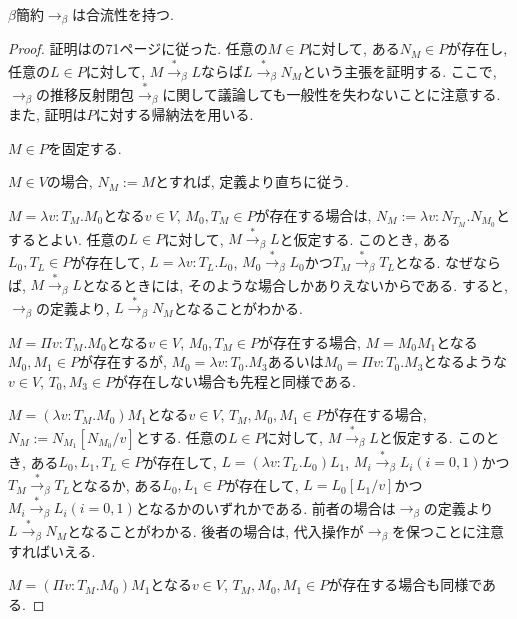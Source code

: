 \documentclass{ltjsarticle}
\begin{document}
\begin{thm}
 $\beta$簡約$\rightarrow_{\beta}$は合流性を持つ.
\end{thm}
\begin{proof}
 証明は\cite{高橋正子1991計算論}の71ページに従った.
任意の$M \in P$に対して, ある$N_M \in P$が存在し, 任意の$L \in P$に対して, 
$M \overset{*}{\rightarrow}_\beta L$ならば$L \overset{*}{\rightarrow}_\beta N_M$という主張を証明する.
ここで, $\rightarrow_\beta$の推移反射閉包$\overset{*}{\rightarrow}_\beta$に関して議論しても一般性を失わないことに注意する.
また, 証明は$P$に対する帰納法を用いる.

$M \in P$を固定する.

$M \in V$の場合, $N_M := M$とすれば, 定義より直ちに従う.

$M = \lambda v \colon T_M . M_0$となる$v \in V$, $M_0, T_M \in P$が存在する場合は, $N_M := \lambda v \colon N_{T_M} . N_{M_0}$とするとよい.
任意の$L \in P$に対して, $M \overset{*}{\rightarrow}_\beta L$と仮定する.
このとき, ある$L_0, T_L \in P$が存在して, $L = \lambda v \colon T_L . L_0$, $M_0 \overset{*}{\rightarrow}_\beta L_0$かつ$T_M \overset{*}{\rightarrow}_\beta T_L$となる.
なぜならば, $M \overset{*}{\rightarrow}_\beta L$となるときには, そのような場合しかありえないからである.
すると, $\rightarrow_{\beta}$の定義より, $L \overset{*}{\rightarrow}_\beta N_M$となることがわかる.

$M = \Pi v \colon T_M . M_0$となる$v \in V$, $M_0, T_M \in P$が存在する場合, 
$M = M_0 M_1$となる$M_0, M_1 \in P$が存在するが, $M_0 = \lambda v \colon T_0 . M_3$あるいは$M_0 = \Pi v \colon T_0 . M_3$となるような$v \in V$, $T_0, M_3 \in P$が存在しない場合も先程と同様である.

$M = (\lambda v : T_M . M_0) M_1$となる$v \in V$, $T_M, M_0, M_1 \in P$が存在する場合, $N_M := N_{M_1}[N_{M_0}/v]$とする.
任意の$L \in P$に対して, $M \overset{*}{\rightarrow}_\beta L$と仮定する.
このとき, ある$L_0, L_1, T_L \in P$が存在して, $L = (\lambda v \colon T_L . L_0) L_1$, $M_i \overset{*}{\rightarrow}_\beta L_i (i = 0, 1)$かつ$T_M \overset{*}{\rightarrow}_\beta T_L$となるか,
ある$L_0, L_1 \in P$が存在して, $L = L_0[L_1/v]$かつ$M_i \overset{*}{\rightarrow}_\beta L_i (i = 0, 1)$となるかのいずれかである.
前者の場合は$\rightarrow_{\beta}$の定義より$L \overset{*}{\rightarrow}_\beta N_M$となることがわかる.
後者の場合は, 代入操作が$\rightarrow_{\beta}$を保つことに注意すればいえる.

$M = (\Pi v : T_M . M_0) M_1$となる$v \in V$, $T_M, M_0, M_1 \in P$が存在する場合も同様である.
\end{proof}
\end{document}

